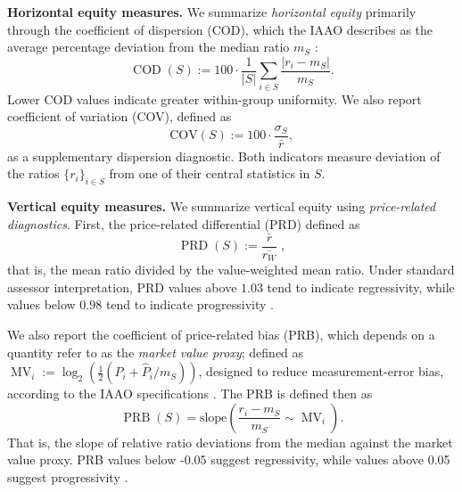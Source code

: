 \documentclass[12pt, draft]{article}
\theoremstyle{plain}
\theoremstyle{definition}
\newcommand{\1}{\mathbf{1}}
\begin{document}
\medskip


\noindent \textbf{Horizontal equity measures.} We summarize \textit{horizontal equity} primarily through the coefficient of dispersion (COD), which the IAAO describes as the average percentage deviation from the median ratio $m_S$ \cite{IAAO2013Ratio,IAAO2025ExposureRatio}:
\begin{equation}
\label{eq:cod}
\operatorname{COD}(S)
:=
100\cdot\frac{1}{|S|}
\sum_{i\in S} \frac{|r_i-m_S|}{m_S}.
\end{equation}
Lower COD values indicate greater within-group uniformity.  We also report coefficient of variation (COV), defined as \begin{equation}    
\mathrm{COV}(S):=100 \cdot \frac{\sigma_S}{\bar r},
\end{equation}
as a supplementary dispersion diagnostic. Both indicators measure deviation of the ratios $\{r_i\}_{i \in S}$ from one of their central statistics in $S$. 


\medskip

\noindent \textbf{Vertical equity measures.} We summarize vertical equity using \textit{price-related diagnostics}. First, the price-related differential (PRD) defined as
\begin{equation}
\label{eq:prd}
\operatorname{PRD}(S)
:=
\frac{\bar r}{\overline{r_W}}\;,
\end{equation}
that is, the mean ratio divided by the value-weighted mean ratio. Under standard assessor interpretation, PRD values above $1.03$ tend to indicate regressivity, while values below $0.98$ tend to indicate progressivity \cite{IAAO2013Ratio,IAAO2025ExposureRatio}.

We also report the coefficient of price-related bias (PRB), which depends on a quantity refer to as the \textit{market value proxy}; defined as $\operatorname{MV}_i := \log_2\left(\frac{1}{2} (P_i + \widehat{P}_i / m_S)\right)$, designed to reduce measurement-error bias, according to the IAAO specifications \cite{IAAO2025ExposureRatio}. The PRB is defined then as 
\begin{equation}
\operatorname{PRB}(S)=\text{slope}\left(\frac{r_i- m_S}{m_S}\sim
  \operatorname{MV}_i\right).
\end{equation}
That is, the slope of relative ratio deviations from the median against the market value proxy. PRB values below -0.05 suggest {regressivity}, while values above 0.05 suggest {progressivity} \cite{IAAO2013Ratio,IAAO2025ExposureRatio}.
\end{document}
